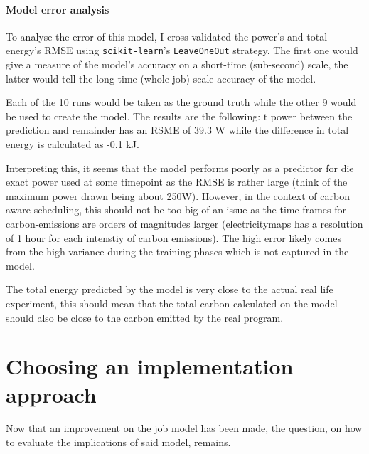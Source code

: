 \paragraph{Model error analysis}

To analyse the error of this model, I cross validated the power's and total energy's RMSE using \verb|scikit-learn|'s \verb|LeaveOneOut| strategy. 
The first one would give a measure of the model's accuracy on a short-time (sub-second) scale, the latter would  tell the long-time (whole job) scale accuracy of the model.

Each of the 10 runs would be taken as the ground truth while the other 9 would be used to create the model. The results are the following: t power between the prediction and remainder has an RSME of 39.3 W while the difference in total energy is calculated as -0.1 kJ. 

Interpreting this, it seems that the model performs poorly as a predictor for die exact power used at some timepoint as the RMSE is rather large (think of the maximum power drawn being about 250W). 
However, in the context of carbon aware scheduling, this should not be too big of an issue as the time frames for carbon-emissions are orders of magnitudes larger (electricitymaps has a resolution of 1 hour for each intenstiy of carbon emissions). 
The high error likely comes from the high variance during the training phases which is not captured in the model.

The total energy predicted by the model is very close to the actual real life experiment, this should mean that the total carbon calculated on the model should also be close to the carbon emitted by the real program.

\section{Choosing an implementation approach}

Now that an improvement on the job model has been made, the question, on how to evaluate the implications of said model, remains. 



